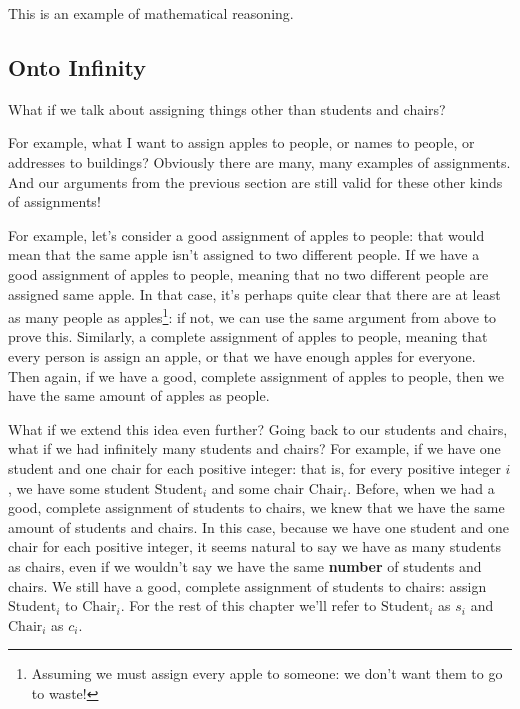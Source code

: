 \documentclass[10pt]{article}
\begin{document}
This is an example of mathematical reasoning.

\subsection{Onto Infinity}


What if we talk about assigning things other than students and chairs?

For example, what I want to assign apples to people, or names to people, or addresses to buildings?
Obviously there are many, many examples of assignments.
And our arguments from the previous section are still valid for these other kinds of assignments!

For example, let's consider a good assignment of apples to people: that would mean that the same apple isn't assigned to two different people.
If we have a good assignment of apples to people, meaning that no two different people are assigned same apple.
In that case, it's perhaps quite clear that there are at least as many people as apples\footnote{Assuming we must assign every apple to someone: we don't want them to go to waste!}: if not, we can use the same argument from above to prove this.
Similarly, a complete assignment of apples to people, meaning that every person is assign an apple, or that we have enough apples for everyone.
Then again, if we have a good, complete assignment of apples to people, then we have the same amount of apples as people.

What if we extend this idea even further?
Going back to our students and chairs, what if we had infinitely many students and chairs?
For example, if we have one student and one chair for each  positive integer: that is, for every positive integer $i$, we have some student $\text{Student}_i$ and some chair $\text{Chair}_i$.
Before, when we had a good, complete assignment of students to chairs, we knew that we have the same amount of students and chairs.
In this case, because we have one student and one chair for each positive integer, it seems natural to say we have as many students as chairs, even if we wouldn't say we have the same \textbf{number} of students and chairs.
We still have a good, complete assignment of students to chairs: assign $\text{Student}_i$ to $\text{Chair}_i$.
For the rest of this chapter we'll refer to $\text{Student}_i$ as $s_i$ and $\text{Chair}_i$ as $c_i$.
\end{document}
